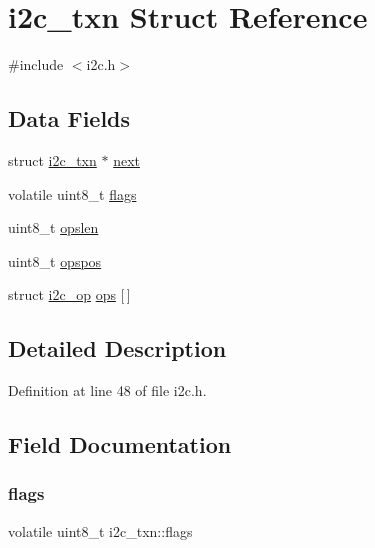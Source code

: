 \hypertarget{structi2c__txn}{}\section{i2c\+\_\+txn Struct Reference}
\label{structi2c__txn}


{\ttfamily \#include $<$i2c.\+h$>$}

\subsection*{Data Fields}
\begin{DoxyCompactItemize}
\item 
struct \hyperlink{structi2c__txn}{i2c\+\_\+txn} $\ast$ \hyperlink{structi2c__txn_a11186c957c400dc51479a883575d4b0d}{next}
\item 
volatile uint8\+\_\+t \hyperlink{structi2c__txn_ab100decf3b628b0ae6f92a71735bef8b}{flags}
\item 
uint8\+\_\+t \hyperlink{structi2c__txn_ad936e904a9dcf5cb352e1b8a1dac60bc}{opslen}
\item 
uint8\+\_\+t \hyperlink{structi2c__txn_ac69407fdd93fd5d96075b8ebf77ecbca}{opspos}
\item 
struct \hyperlink{structi2c__op}{i2c\+\_\+op} \hyperlink{structi2c__txn_a49e5dbfb39ee1df7021f37ec67c8d2e0}{ops} \mbox{[}$\,$\mbox{]}
\end{DoxyCompactItemize}


\subsection{Detailed Description}


Definition at line 48 of file i2c.\+h.



\subsection{Field Documentation}
\mbox{\label{structi2c__txn_ab100decf3b628b0ae6f92a71735bef8b}} 
\subsubsection{\texorpdfstring{flags}{flags}}
{\footnotesize\ttfamily volatile uint8\+\_\+t i2c\+\_\+txn\+::flags}



